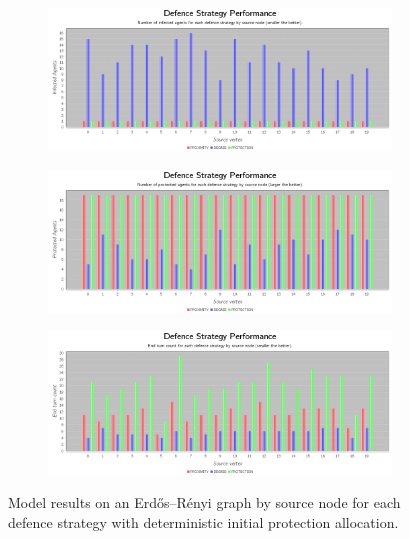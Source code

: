 \documentclass[results.tex]{subfiles}
\begin{document}


\newpage

\begin{figure}[!ht]
\centering
     \begin{subfigure}[b]{0.9\textwidth}
         \centering
         \includegraphics[width=\textwidth]{Deterministic/DeterministicInfectedChart}
         \label{fig:er-det-infected}
     \end{subfigure}
     \vfill
     \begin{subfigure}[b]{0.9\textwidth}
         \centering
         \includegraphics[width=\textwidth]{Deterministic/DeterministicProtectedChart}
         \label{fig:er-det-protected}
     \end{subfigure}
     \vfill
     \begin{subfigure}[b]{0.9\textwidth}
         \centering
         \includegraphics[width=\textwidth]{Deterministic/DeterministicEndTurnChart}
         \label{fig:er-det-end}
     \end{subfigure}
        \caption{Model results on an Erdős–Rényi graph by source node for each defence strategy with deterministic initial protection allocation.}
        \label{fig:er-det-charts}
\end{figure}
\end{document}
